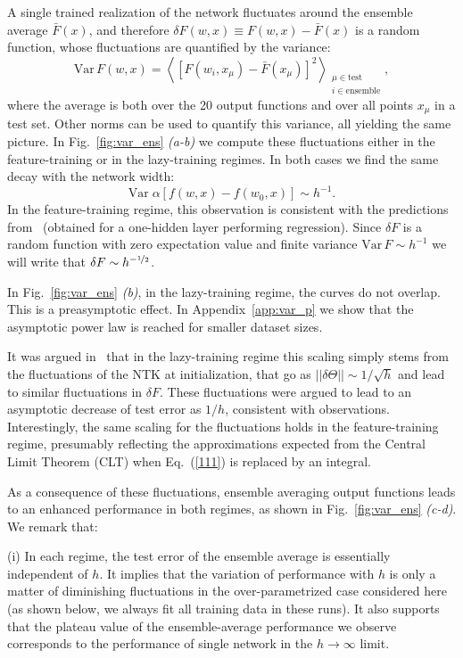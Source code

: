 \documentclass{article}
\newcommand{\be}{\begin{equation}}
\newcommand{\ee}{\end{equation}}
\renewcommand{\cite}[1]{\citep{#1}}
\newcommand{\mr}{\mathrm}
\newcommand{\abs}[1]{|\!|#1|\!|}
\newcommand{\eref}[1]{Eq.~(\ref{#1})}
\newcommand{\aref}[1]{Appendix~\ref{#1}}
\newcommand{\fref}[1]{Fig.~\ref{#1}}
\begin{document}
A single trained realization of the network fluctuates around the ensemble average $\bar F(x)$, and therefore $\delta F(w,x) \equiv F(w,x) - \bar F(x)$ is a random function, whose fluctuations are quantified by the variance: 
\be
\mr{Var}\, F(w,x) = \left\langle \left[F(w_i,x_\mu) - \bar F(x_\mu)\right]^2 \right\rangle_{\substack{ \mu\in\mr{test} \\ i\in\mr{ensemble} }}\!\!\!,
\ee
where the average is both over the 20 output functions and over all points $x_\mu$ in a test set. Other norms can be used to quantify this variance, all yielding the same picture. In \fref{fig:var_ens} \emph{(a-b)} we compute these fluctuations either in the feature-training or in the lazy-training regimes. In both cases we find the same decay with the network width:
\be
\mr{Var} \; \alpha\left[ f(w,x) - f(w_0,x) \right] \sim h^{-1}. \label{eq:fluctuations}
\ee
In the feature-training regime, this observation is consistent with the predictions from~\cite{rotskoff2018neural} (obtained for a one-hidden layer performing regression).
Since $\delta F$ is a random function with zero expectation value and finite variance $\mr{Var}\, F \sim h^{-1}$ we will write that $\delta F \sim h^{-\nicefrac12}$.

In \fref{fig:var_ens} \emph{(b)}, in the lazy-training regime, the curves do not overlap. This is a preasymptotic effect. In \aref{app:var_p} we show that the asymptotic power law is reached for smaller dataset sizes.


It was argued in~\cite{geiger2019scaling} that in the lazy-training regime this scaling simply stems from the fluctuations of the NTK at initialization, that go as $\abs{\delta \Theta} \sim 1/\sqrt{h}$ and lead to similar fluctuations in $\delta F$. These fluctuations were argued to lead to an asymptotic decrease of test error as $1/h$, consistent with observations. Interestingly, the same scaling for the fluctuations holds in the feature-training regime, presumably reflecting the approximations expected from the Central Limit Theorem (CLT) when \eref{111} is replaced by an integral. 



As a consequence of these fluctuations, ensemble averaging output functions leads to an enhanced performance in both regimes, as shown in \fref{fig:var_ens} \emph{(c-d)}. We remark that:

(i) In each regime, the test error of the ensemble average is essentially independent of $h$. It implies that the variation of performance with $h$ is only a matter of diminishing fluctuations in the over-parametrized case considered here (as shown below, we always fit all training data in these runs). It also supports that the plateau value of the ensemble-average  performance we observe corresponds to the performance of single network in the $h\rightarrow\infty$ limit. 
\end{document}
